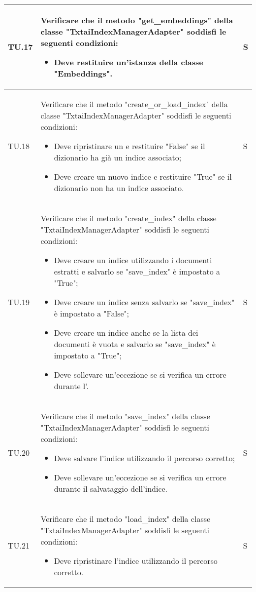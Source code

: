 \begin{adjustwidth}{-0.5cm}{-0.5cm}
\begin{longtable}{|P{1.5cm}|>{\raggedright}P{9.5cm}|>{\arraybackslash}P{1.5cm}|}
		\hline TU.17 & Verificare che il metodo "get\_embeddings" della classe "TxtaiIndexManagerAdapter" soddisfi le seguenti condizioni:
		\begin{itemize}
			\item Deve restituire un'istanza della classe "Embeddings".
		\end{itemize} & S \\

		\hline TU.18 & Verificare che il metodo "create\_or\_load\_index" della classe "TxtaiIndexManagerAdapter" soddisfi le seguenti condizioni:
		\begin{itemize}
			\item Deve ripristinare un  e restituire "False" se il dizionario ha già un indice associato;
			\item Deve creare un nuovo indice e restituire "True" se il dizionario non ha un indice associato.
		\end{itemize} & S \\

		\hline TU.19 & Verificare che il metodo "create\_index" della classe "TxtaiIndexManagerAdapter" soddisfi le seguenti condizioni:
		\begin{itemize}
			\item Deve creare un indice utilizzando i documenti estratti e salvarlo se "save\_index" è impostato a "True";
			\item Deve creare un indice senza salvarlo se "save\_index" è impostato a "False";
			\item Deve creare un indice anche se la lista dei documenti è vuota e salvarlo se "save\_index" è impostato a "True";
			\item Deve sollevare un'eccezione se si verifica un errore durante l'.
		\end{itemize} & S \\

		\hline TU.20 & Verificare che il metodo "save\_index" della classe "TxtaiIndexManagerAdapter" soddisfi le seguenti condizioni:
		\begin{itemize}
			\item Deve salvare l'indice utilizzando il percorso corretto;
			\item Deve sollevare un'eccezione se si verifica un errore durante il salvataggio dell'indice.
		\end{itemize} & S \\

		\hline TU.21 & Verificare che il metodo "load\_index" della classe "TxtaiIndexManagerAdapter" soddisfi le seguenti condizioni:
		\begin{itemize}
			\item Deve ripristinare l'indice utilizzando il percorso corretto.
		\end{itemize} & S \\


\end{longtable}
\end{adjustwidth}
